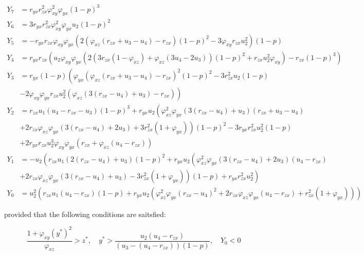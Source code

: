 \begin{theorem}
    \begin{align*}
        Y_7 &= r_{yx}r_{zx}^2\varphi_{xy}^2\varphi_{yx}\left(1-p\right)^3\\
        Y_6 &= 3r_{yx}r_{zx}^2\varphi_{xy}^2\varphi_{yx}u_2\left(1-p\right)^2\\
        Y_5 &= -r_{yx}r_{zx}\varphi_{xy}\varphi_{yx}\left(2\left(\varphi_{xz}\left(r_{zx}+u_3-u_4\right)-r_{zx}\right)\left(1-p\right)^2-3\varphi_{xy}r_{zx}u_2^2\right)\left(1-p\right)\\
        Y_4 &= r_{yx}r_{zx}\left(u_2\varphi_{xy}\varphi_{yx}\left(2\left(3r_{zx}\left(1-\varphi_{xz}\right)+\varphi_{xz}\left(3u_4-2u_3\right)\right)\left(1-p\right)^2+r_{zx}u_2^2\varphi_{xy}\right)-r_{zx}\left(1-p\right)^3\right)\\
        Y_3 &= r_{yx}\left(1-p\right)\left(\varphi_{yx}\left(\varphi_{xz}\left(r_{zx}+u_3-u_4\right)-r_{zx}\right)^2\left(1-p\right)^2-3r_{zx}^2u_2\left(1-p\right)\right.\\
            &\left.-2\varphi_{xy}\varphi_{yx}r_{zx}u_2^2\left(\varphi_{xz}\left(3\left(r_{zx}-u_4\right)+u_3\right)-r_{zx}\right)\right)\\
        Y_2 &= r_{zx}u_1\left(u_4-r_{zx}-u_3\right)\left(1-p\right)^3+r_{yx}u_2\left(\varphi_{xz}^2\varphi_{yx}\left(3\left(r_{zx}-u_4\right)+u_3\right)\left(r_{zx}+u_3-u_4\right)\right.\\
            &\left.+2r_{zx}\varphi_{xz}\varphi_{yx}\left(3\left(r_{zx}-u_4\right)+2u_3\right)+3r_{zx}^2\left(1+\varphi_{yx}\right)\right)\left(1-p\right)^2-3r_{yx}r_{zx}^2u_2^2\left(1-p\right)\\
            &+2r_{yx}r_{zx}u_2^3\varphi_{xy}\varphi_{yx}\left(r_{zx}+\varphi_{xz}\left(u_4-r_{zx}\right)\right)\\
        Y_1 &= -u_2\left(r_{zx}u_1\left(2\left(r_{zx}-u_4\right)+u_3\right)\left(1-p\right)^2+r_{yx}u_2\left(\varphi_{xz}^2\varphi_{yx}\left(3\left(r_{zx}-u_4\right)+2u_3\right)\left(u_4-r_{zx}\right)\right.\right.\\
            &\left.\left.+2r_{zx}\varphi_{xz}\varphi_{yx}\left(3\left(r_{zx}-u_4\right)+u_3\right)-3r_{zx}^2\left(1+\varphi_{yx}\right)\right)\left(1-p\right)+r_{yx}r_{zx}^2u_2^2\right)\\
        Y_0 &= u_2^2\left(r_{zx}u_1\left(u_4-r_{zx}\right)\left(1-p\right)+r_{yx}u_2\left(\varphi_{xz}^2\varphi_{yx}\left(r_{zx}-u_4\right)^2+2r_{zx}\varphi_{xz}\varphi_{yx}\left(u_4-r_{zx}\right)+r_{zx}^2\left(1+\varphi_{yx}\right)\right)\right)
    \end{align*}

    provided that the following conditions are saitsfied:
    
    \begin{equation*}
        \frac{1+\varphi_{xy}\left(y^*\right)^2}{\varphi_{xz}}>z^*,\quad y^*>\frac{u_2\left(u_4-r_{zx}\right)}{\left(u_3-\left(u_4-r_{zx}\right)\right)\left(1-p\right)},\quad Y_0<0
    \end{equation*}
\end{theorem}
